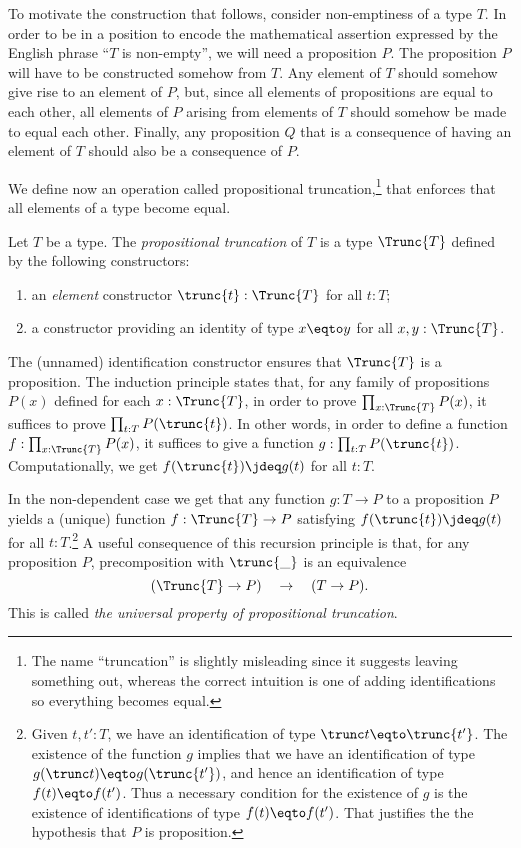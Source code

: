 To motivate the construction that follows, consider non-emptiness of a type $T$.  In order to be in a position to encode the mathematical
assertion expressed by the English phrase ``$T$ is non-empty'', we will need a proposition $P$.  The proposition $P$ will have to be constructed
somehow from $T$.  Any element of $T$ should somehow give rise to an element of $P$, but, since all elements of propositions are equal to each
other, all elements of $P$ arising from elements of $T$ should somehow be made to equal each other.  Finally, any proposition $Q$ that is a
consequence of having an element of $T$ should also be a consequence of $P$.

We define now an operation called propositional truncation,\footnote{%
The name ``truncation'' is slightly misleading since it suggests leaving
something out, whereas the correct intuition is one of adding identifications
so everything becomes equal.}
that enforces that all elements of a type become equal.

\begin{definition}\label{def:prop-trunc}
Let $T$ be a type. The \emph{propositional truncation} of $T$
is a type  $\Trunc{T}$ defined by the following constructors:
\begin{enumerate}
\item an \emph{element} constructor $\trunc{t} : \Trunc{T}$ for all $t:T$;
\item a constructor providing an identity of type $x \eqto y$  for all $x,y:\Trunc{T}$.
\end{enumerate}
The (unnamed) identification constructor ensures that $\Trunc{T}$ is a
proposition. The induction principle states that,
for any family of propositions $P(x)$ defined for each $x:\Trunc{T}$,
in order to prove $\prod_{x:\Trunc{T}} P(x)$,
it suffices to prove $\prod_{t:T} P(\trunc{t})$. In other
words, in order to define a function $f:\prod_{x:\Trunc{T}} P(x)$,
it suffices to give a function $g: \prod_{t:T} P(\trunc{t})$.
Computationally, we get $f(\trunc{t})\jdeq g(t)$ for all $t:T$.
\end{definition}

In the non-dependent case we get that
any function $g: T\to P$ to a proposition $P$ yields a (unique) function $f:\Trunc{T}\to P$
satisfying $f(\trunc{t})\jdeq g(t)$ for all $t:T$.\footnote{%
Given $t, t' : T$, we have an identification of type $ \trunc t \eqto \trunc {t'} $.
The existence of the function $g$ implies that we have an identification of type $ g(\trunc t) \eqto g(\trunc {t'}) $,
and hence an identification of type $f(t) \eqto f(t')$.  Thus a necessary condition for the existence of $g$ is
the existence of identifications of type $f(t) \eqto f(t')$.  That justifies the
the hypothesis that $P$ is proposition.}
A useful consequence of this recursion principle is that,
for any proposition $P$, precomposition with $\trunc{\_}$ is an equivalence
\[
(\Trunc{T} \to P) \quad \to \quad (T \to P).
\]
This is called \emph{the universal property of propositional truncation}.

